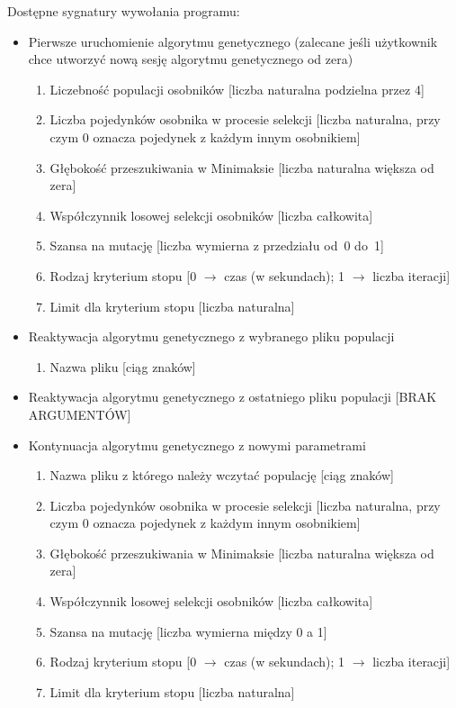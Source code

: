 Dostępne sygnatury wywołania programu:
\begin{itemize}
    \item Pierwsze uruchomienie algorytmu genetycznego (zalecane jeśli użytkownik chce utworzyć nową sesję algorytmu genetycznego od zera)
    \begin{enumerate}
        \item Liczebność populacji osobników [liczba naturalna podzielna przez 4]
        \item Liczba pojedynków osobnika w procesie selekcji [liczba naturalna, przy czym 0 oznacza pojedynek z każdym innym osobnikiem]
        \item Głębokość przeszukiwania w Minimaksie [liczba naturalna większa od zera]
        \item Współczynnik losowej selekcji osobników [liczba całkowita]
        \item Szansa na mutację [liczba wymierna z przedziału od~0 do~1]
        \item Rodzaj kryterium stopu [0 $\rightarrow$ czas (w sekundach); 1 $\rightarrow$ liczba iteracji]
        \item Limit dla kryterium stopu [liczba naturalna]
    \end{enumerate}
    \item Reaktywacja algorytmu genetycznego z wybranego pliku populacji
    \begin{enumerate}
        \item Nazwa pliku [ciąg znaków]
    \end{enumerate}
    \item Reaktywacja algorytmu genetycznego z ostatniego pliku populacji [BRAK ARGUMENTÓW]
    \vspace{1cm}
    \item Kontynuacja algorytmu genetycznego z nowymi parametrami
    \begin{enumerate}
        \item Nazwa pliku z którego należy wczytać populację [ciąg znaków]
        \item Liczba pojedynków osobnika w procesie selekcji [liczba naturalna, przy czym 0 oznacza pojedynek z każdym innym osobnikiem]
        \item Głębokość przeszukiwania w Minimaksie [liczba naturalna większa od zera]
        \item Współczynnik losowej selekcji osobników [liczba całkowita]
        \item Szansa na mutację [liczba wymierna między 0 a 1]
        \item Rodzaj kryterium stopu [0 $\rightarrow$ czas (w sekundach); 1 $\rightarrow$ liczba iteracji]
        \item Limit dla kryterium stopu [liczba naturalna]
    \end{enumerate}
\end{itemize}

